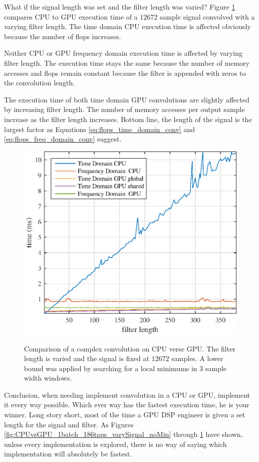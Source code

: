 What if the signal length was set and the filter length was varied?
Figure \ref{fig:CPUvsGPU_1batch_12672signal_varyFilter} compares CPU to GPU execution time of a $12672$ sample signal convolved with a varying filter length.
The time domain CPU execution time is affected obviously because the number of flops increases.

Neither CPU or GPU frequency domain execution time is affected by varying filter length.
The execution time stays the same because the number of memory accesses and flops remain constant because the filter is appended with zeros to the convolution length.

The execution time of both time domain GPU convolutions are slightly affected by increasing filter length.
The number of memory accesses per output sample increase as the filter length increases.
Bottom line, the length of the signal is the largest factor as Equations \ref{eq:flops_time_domain_conv} and \ref{eq:flops_freq_domain_conv} suggest.
\begin{figure}
	\caption{Comparison of a complex convolution on CPU verse GPU. The filter length is varied and the signal is fixed at $12672$ samples. A lower bound was applied by searching for a local minimums in $3$ sample width windows.}
	\centering\includegraphics[width=5in]{figures/gpu_intro/CPUvsGPU_1batch_12672signal_varyFilter.eps}
	\label{fig:CPUvsGPU_1batch_12672signal_varyFilter}
\end{figure}

Conclusion, when needing implement convolution in a CPU or GPU, implement it every way possible.
Which ever way has the fastest execution time, he is your winner.
Long story short, most of the time a GPU DSP engineer is given a set length for the signal and filter.
As Figures \ref{fig:CPUvsGPU_1batch_186taps_varySignal_noMin} through \ref{fig:CPUvsGPU_1batch_12672signal_varyFilter} have shown, unless every implementation is explored, there is no way of saying which implementation will absolutely be fastest.

